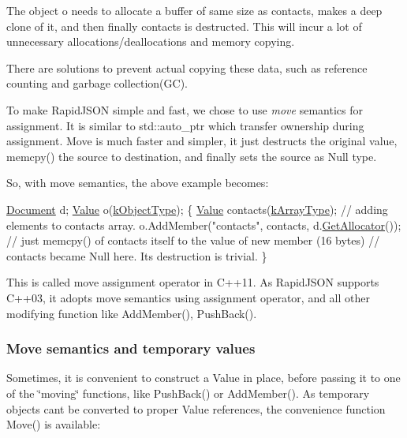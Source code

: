 The object {\ttfamily o} needs to allocate a buffer of same size as contacts, makes a deep clone of it, and then finally contacts is destructed. This will incur a lot of unnecessary allocations/deallocations and memory copying.

There are solutions to prevent actual copying these data, such as reference counting and garbage collection(\+G\+C).

To make Rapid\+J\+S\+ON simple and fast, we chose to use {\itshape move} semantics for assignment. It is similar to {\ttfamily std\+::auto\+\_\+ptr} which transfer ownership during assignment. Move is much faster and simpler, it just destructs the original value, {\ttfamily memcpy()} the source to destination, and finally sets the source as Null type.

So, with move semantics, the above example becomes\+:


\begin{DoxyCode}
\hyperlink{class_generic_document}{Document} d;
\hyperlink{class_generic_value}{Value} o(\hyperlink{rapidjson_8h_a1d1cfd8ffb84e947f82999c682b666a7a146f46700e905e8df96a6a90b5c7640f}{kObjectType});
\{
    \hyperlink{class_generic_value}{Value} contacts(\hyperlink{rapidjson_8h_a1d1cfd8ffb84e947f82999c682b666a7af41527d6925efa3c5c3dadb23dfef7c8}{kArrayType});
    \textcolor{comment}{// adding elements to contacts array.}
    o.AddMember(\textcolor{stringliteral}{"contacts"}, contacts, d.\hyperlink{class_generic_document_aa4609d6b19f86aec1a6b96edf2c27686}{GetAllocator}());  \textcolor{comment}{// just memcpy() of contacts itself
       to the value of new member (16 bytes)}
    \textcolor{comment}{// contacts became Null here. Its destruction is trivial.}
\}
\end{DoxyCode}




This is called move assignment operator in C++11. As Rapid\+J\+S\+ON supports C++03, it adopts move semantics using assignment operator, and all other modifying function like {\ttfamily Add\+Member()}, {\ttfamily Push\+Back()}.\hypertarget{md_Commun_Externe_RapidJSON_doc_tutorial.zh-cn_TemporaryValues}{}\subsubsection{Move semantics and temporary values}\label{md_Commun_Externe_RapidJSON_doc_tutorial.zh-cn_TemporaryValues}
Sometimes, it is convenient to construct a Value in place, before passing it to one of the \char`\"{}moving\char`\"{} functions, like {\ttfamily Push\+Back()} or {\ttfamily Add\+Member()}. As temporary objects can\textquotesingle{}t be converted to proper Value references, the convenience function {\ttfamily Move()} is available\+:


